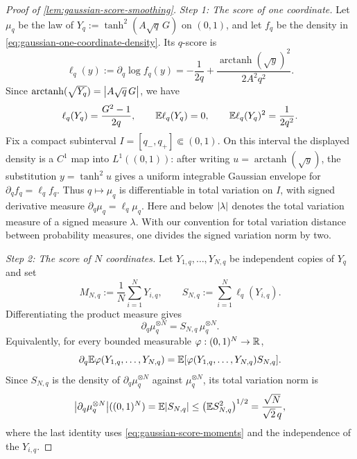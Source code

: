 \documentclass[11pt,reqno,a4paper]{article}
\newcommand{\Ee}{\E}
\DeclareMathOperator{\arctanh}{arctanh}
\begin{document}
\begin{proof}[Proof of \cref{lem:gaussian-score-smoothing}]
  \emph{Step 1: The score of one coordinate.}
  Let $\mu_q$ be the law of $Y_q:=\tanh^2(A\sqrt q\,G)$ on $(0,1)$, and let
  $f_q$ be the density in \cref{eq:gaussian-one-coordinate-density}.
  Its $q$-score is
  \begin{equation}\label{eq:gaussian-one-coordinate-score}
    \ell_q(y)
    :=
    \partial_q\log f_q(y)
    =
    -\frac1{2q}
    +
    \frac{\arctanh(\sqrt y)^2}{2A^2q^2}.
  \end{equation}
  Since
  $\arctanh(\sqrt{Y_q})=\abs{A\sqrt q\,G}$, we have
  \begin{equation}\label{eq:gaussian-score-moments}
    \ell_q(Y_q)=\frac{G^2-1}{2q},
    \qquad
    \Ee \ell_q(Y_q)=0,
    \qquad
    \Ee \ell_q(Y_q)^2=\frac1{2q^2}.
  \end{equation}
  Fix a compact subinterval $I=[q_-,q_+]\Subset(0,1)$. On this interval the
  displayed density is a $C^1$ map into $L^1((0,1))$: after writing
  $u=\arctanh(\sqrt y)$, the substitution $y=\tanh^2u$ gives a
  uniform integrable Gaussian envelope for $\partial_qf_q=\ell_qf_q$. Thus
  $q\mapsto\mu_q$ is differentiable in total variation on $I$, with signed
  derivative measure $\partial_q\mu_q=\ell_q\mu_q$. Here and below
  $\abs\lambda$ denotes the total variation measure of a signed measure
  $\lambda$. With our convention for total variation distance between
  probability measures, one divides the signed variation norm by two.

  \emph{Step 2: The score of $N$ coordinates.}
  Let $Y_{1,q},\ldots,Y_{N,q}$ be independent copies of $Y_q$ and set
  \begin{equation*}
    M_{N,q}:=\frac1N\sum_{i=1}^N Y_{i,q},
    \qquad
    S_{N,q}:=\sum_{i=1}^N\ell_q(Y_{i,q}).
  \end{equation*}
  Differentiating the product measure gives
  \begin{equation}\label{eq:gaussian-product-score-derivative}
    \partial_q\mu_q^{\otimes N}
    =
    S_{N,q}\,\mu_q^{\otimes N}.
  \end{equation}
  Equivalently, for every bounded measurable $\varphi:(0,1)^N\to\mathbb{R}$,
  \begin{equation}\label{eq:gaussian-score-test-function}
    \partial_q\Ee\varphi(Y_{1,q},\ldots,Y_{N,q})
    =
    \Ee\left[
      \varphi(Y_{1,q},\ldots,Y_{N,q})S_{N,q}
    \right].
  \end{equation}
  Since $S_{N,q}$ is the density of $\partial_q\mu_q^{\otimes N}$ against
  $\mu_q^{\otimes N}$, its total variation norm is
  \begin{equation}\label{eq:gaussian-score-product-bound}
    \abs{\partial_q\mu_q^{\otimes N}}((0,1)^N)
    =
    \Ee\abs{S_{N,q}}
    \leq
    \left(\Ee S_{N,q}^2\right)^{1/2}
    =
    \frac{\sqrt N}{\sqrt2\,q},
  \end{equation}
  where the last identity uses \cref{eq:gaussian-score-moments} and the
  independence of the $Y_{i,q}$.


\end{proof}
\end{document}
